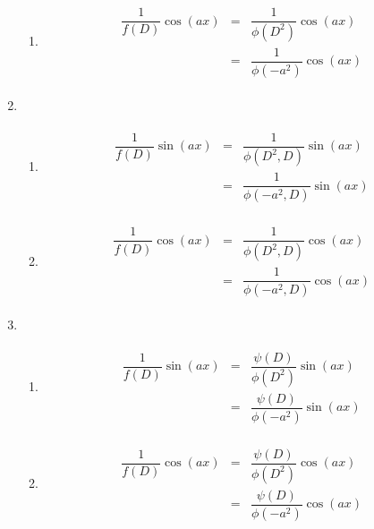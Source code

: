 \begin{enumerate}
\begin{enumerate}
		\item \begin{equation}\begin{aligned}\begin{split} \dfrac{1}{f(D)} \cos (ax) &=& \dfrac{1}{\phi(D^2)} \cos (ax)&\\ &=&\dfrac{1}{\phi(-a^2)} \cos (ax) \end{split}\end{aligned}\end{equation}
	\end{enumerate}

	\item \begin{enumerate}
		\item \begin{equation}\begin{aligned}\begin{split} \dfrac{1}{f(D)} \sin (ax) &=& \dfrac{1}{\phi(D^2,D)} \sin (ax)&\\ &=&\dfrac{1}{\phi(-a^2,D)} \sin (ax) \end{split}\end{aligned}\end{equation}

		\item \begin{equation}\begin{aligned}\begin{split} \dfrac{1}{f(D)} \cos (ax) &=& \dfrac{1}{\phi(D^2,D)} \cos (ax)&\\ &=&\dfrac{1}{\phi(-a^2,D)} \cos (ax) \end{split}\end{aligned}\end{equation}
	\end{enumerate}

	\item \begin{enumerate}
		\item \begin{equation}\begin{aligned}\begin{split} \dfrac{1}{f(D)} \sin (ax) &=& \dfrac{\psi(D)}{\phi(D^2)} \sin (ax)&\\ &=&\dfrac{\psi(D)}{\phi(-a^2)} \sin (ax) \end{split}\end{aligned}\end{equation}

		\item \begin{equation}\begin{aligned}\begin{split} \dfrac{1}{f(D)} \cos (ax) &=& \dfrac{\psi(D)}{\phi(D^2)} \cos (ax)&\\ &=&\dfrac{\psi(D)}{\phi(-a^2)} \cos (ax) \end{split}\end{aligned}\end{equation}
	\end{enumerate}


\end{enumerate}
